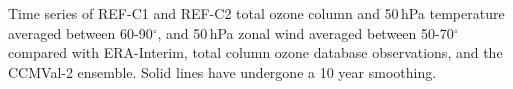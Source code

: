 \label{fig:time_series}
Time series of REF-C1 and REF-C2 total ozone column and 50\,hPa temperature averaged between 60-90$^{\circ}$, and 50\,hPa zonal wind averaged between 50-70$^{\circ}$ compared with ERA-Interim, total column ozone database observations, and the CCMVal-2 ensemble. Solid lines have undergone a 10 year smoothing.